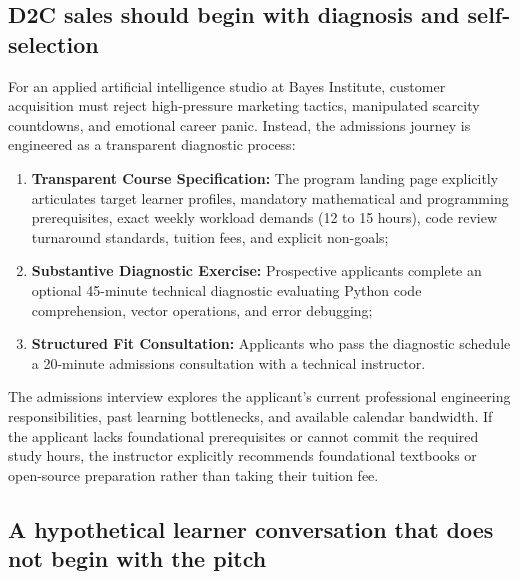 \subsection{D2C sales should begin with diagnosis and self-selection}

For an applied artificial intelligence studio at Bayes Institute, customer acquisition must reject high-pressure marketing tactics, manipulated scarcity countdowns, and emotional career panic. Instead, the admissions journey is engineered as a transparent diagnostic process:
\begin{enumerate}
\item \textbf{Transparent Course Specification:} The program landing page explicitly articulates target learner profiles, mandatory mathematical and programming prerequisites, exact weekly workload demands (12 to 15 hours), code review turnaround standards, tuition fees, and explicit non-goals;
\item \textbf{Substantive Diagnostic Exercise:} Prospective applicants complete an optional 45-minute technical diagnostic evaluating Python code comprehension, vector operations, and error debugging;
\item \textbf{Structured Fit Consultation:} Applicants who pass the diagnostic schedule a 20-minute admissions consultation with a technical instructor.
\end{enumerate}
The admissions interview explores the applicant's current professional engineering responsibilities, past learning bottlenecks, and available calendar bandwidth. If the applicant lacks foundational prerequisites or cannot commit the required study hours, the instructor explicitly recommends foundational textbooks or open-source preparation rather than taking their tuition fee.

\subsection{A hypothetical learner conversation that does not begin with the pitch}


